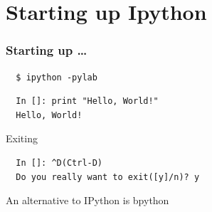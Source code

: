 \documentclass[14pt,compress]{beamer}
\begin{document}

\section{Starting up Ipython}
\begin{frame}[fragile]
\frametitle{Starting up \ldots}
\begin{block}{}
\begin{lstlisting}
  $ ipython -pylab
\end{lstlisting} %
\end{block}
\begin{lstlisting}     
  In []: print "Hello, World!"
  Hello, World!
\end{lstlisting}
Exiting
\begin{lstlisting}
  In []: ^D(Ctrl-D)
  Do you really want to exit([y]/n)? y
\end{lstlisting}
An alternative to IPython is bpython
\end{frame}

\end{document}
